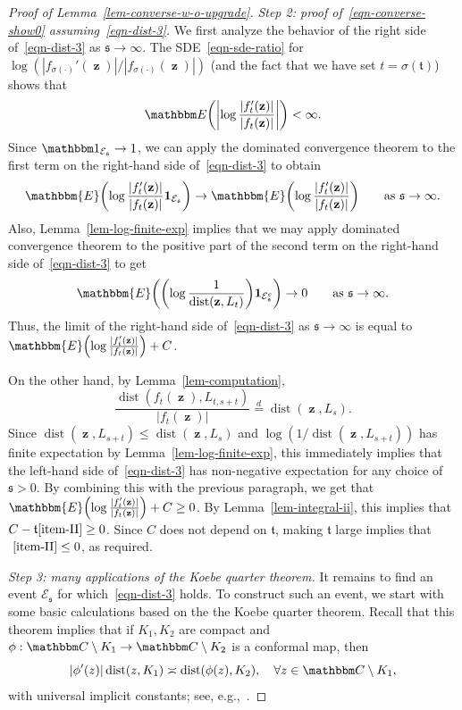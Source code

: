 \documentclass[11pt]{article}
\theoremstyle{plain}
\theoremstyle{definition}
\numberwithin{equation}{section}
\newcommand{\eqbn}{\begin{equation*}}
\newcommand{\eqen}{\end{equation*}}
\newcommand{\BB}{\mathbbm}
\newcommand{\op}{\operatorname}
\newcommand{\eqD}{\overset{d}{=}}
\newcommand{\rta}{\rightarrow}
\newcommand{\mcl}{\mathcal}
\newcommand{\dist}{{\operatorname{dist}}}
\newcommand{\zz}{{\op{\mathbf{z}}}}
\newcommand{\tz}{{\mathfrak t}}
\newcommand{\sz}{{\mathfrak s}}
\let\originalleft\left
\let\originalright\right
\renewcommand{\left}{\mathopen{}\mathclose\bgroup\originalleft}
\renewcommand{\right}{\aftergroup\egroup\originalright}
\begin{document}
\begin{proof}[Proof of Lemma~\ref{lem-converse-w-o-upgrade}]
\noindent\textit{Step 2: proof of~\eqref{eqn-converse-show0} assuming~\eqref{eqn-dist-3}.}
We first analyze the behavior of the right side of~\eqref{eqn-dist-3} as $\sz \rta\infty$. 
The SDE~\eqref{eqn-sde-ratio} for $\log(|f_{\sigma(\cdot)}'(\zz)| / |f_{\sigma(\cdot)}(\zz)|)$ (and the fact that we have set $t=\sigma(\tz)$) shows that 
\eqbn
\BB E\left( \left|\log \frac{|f_{t}'(\zz)| }{ |f_{t}(\zz)|} \right| \right) < \infty .
\eqen 
Since $\BB 1_{\mcl E_{\sz}} \rta 1$, we can apply the dominated convergence theorem to the first term on the right-hand side of~\eqref{eqn-dist-3} to obtain
\eqbn
\BB{E}\left(  \log \frac{|f_t'(\zz)|}{|f_t(\zz)|} \mathbf{1}_{\mcl{E}_{\sz}} \right) \rightarrow \BB{E}\left(  \log \frac{|f_t'(\zz)|}{|f_t(\zz)|} \right) \qquad \text{as $\sz \rta \infty$}.
\eqen 
Also, Lemma~\ref{lem-log-finite-exp} implies that we may apply dominated convergence theorem to the positive part of the second term on the right-hand side of~\eqref{eqn-dist-3} to get 
\eqbn
\BB{E}\left(  \left( \log \frac{1}{\dist(\zz,L_t)} \right)   \mathbf{1}_{\mcl{E}_{\sz}^c}  \right) \rta 0 \qquad \text{as $\sz \rta \infty$}.
\eqen
Thus, the limit of the right-hand side of~\eqref{eqn-dist-3}  as $\sz \rta \infty$ is equal to $\BB{E}\left(  \log \frac{|f_t'(\zz)|}{|f_t(\zz)|} \right) + C$. 

On the other hand, by Lemma~\ref{lem-computation}, 
\eqbn
  \frac{\dist(f_t(\zz), L_{t,s+t})}{|f_t(\zz)|} \eqD \dist(\zz,L_s). 
\eqen
Since $\op{dist}(\zz , L_{s+t}) \leq \op{dist}(\zz , L_s)$ and $\log(1 / \op{dist}(\zz , L_{s+t}))$ has finite expectation by Lemma~\ref{lem-log-finite-exp}, this immediately implies that the left-hand side of~\eqref{eqn-dist-3} has non-negative expectation for any choice of $\sz >0$. By combining this with the previous paragraph, we get that $\BB{E}\left(  \log \frac{|f_t'(\zz)|}{|f_t(\zz)|} \right) + C \geq 0$. By Lemma~\ref{lem-integral-ii}, this implies that $C - \tz \ref{item-II} \geq 0$. Since $C$ does not depend on $\tz$, making $\tz$ large implies that $~\ref{item-II} \leq 0$, as required. 
\medskip

\noindent\textit{Step 3: many applications of the Koebe quarter theorem.}
It remains to find an event $\mcl E_{\sz}$ for which~\eqref{eqn-dist-3} holds. To construct such an event, we start with some basic calculations based on the the Koebe quarter theorem. Recall that this theorem implies that if $K_1,K_2$ are compact and $\phi : \BB C\setminus K_1 \rta \BB C\setminus K_2$ is a conformal map, then 
\eqbn
|\phi'(z)| \op{dist}(z,K_1) \asymp \op{dist}(\phi(z),K_2) ,\quad\forall z\in \BB C\setminus K_1 ,
\eqen
with universal implicit constants; see, e.g.,~\cite[Corollary 3.18]{lawler-book}. 
  

\end{proof}
\end{document}
